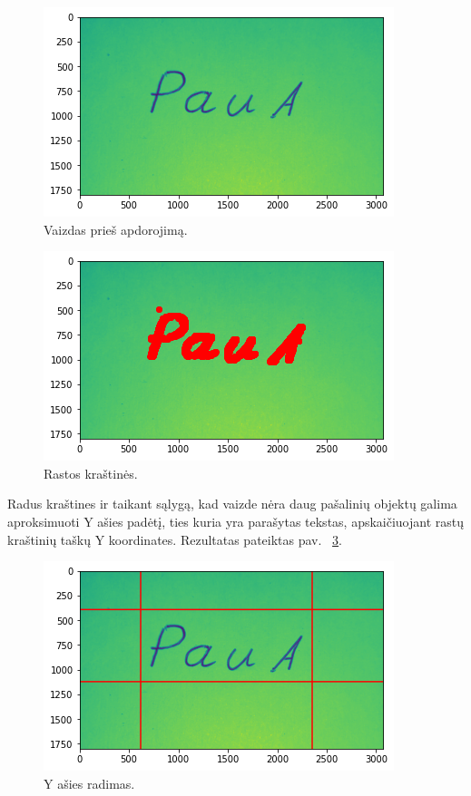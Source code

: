 \documentclass[conference]{IEEEtran}
\begin{document}
\begin{figure}[!h] %
\centerline{\includegraphics[scale=0.4] {images/before.png}}
\caption{Vaizdas prieš apdorojimą.}
\label{fig2}
\end{figure}

\begin{figure}[!h] %
\centerline{\includegraphics[scale=0.4] {images/after.png}}
\caption{Rastos kraštinės.}
\label{fig3}
\end{figure}

\par
Radus kraštines ir taikant sąlygą, kad vaizde nėra daug pašalinių objektų galima
aproksimuoti Y ašies padėtį, ties kuria yra parašytas tekstas, apskaičiuojant rastų kraštinių
taškų Y koordinates. Rezultatas pateiktas pav. ~\ref{fig4}.

\begin{figure}[!h] %
\centerline{\includegraphics[scale=0.4] {images/aprox.png}}
\caption{Y ašies radimas.}
\label{fig4}
\end{figure}
\end{document}
